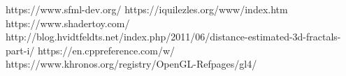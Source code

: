 \documentclass[12pt]{report}
\begin{document}
\begin{thebibliography}{9}
	https://www.sfml-dev.org/
	https://iquilezles.org/www/index.htm
	https://www.shadertoy.com/
	http://blog.hvidtfeldts.net/index.php/2011/06/distance-estimated-3d-fractals-part-i/
	https://en.cppreference.com/w/
	https://www.khronos.org/registry/OpenGL-Refpages/gl4/
\end{thebibliography}
\end{document}
